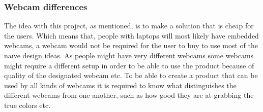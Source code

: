 \subsubsection{Webcam differences}
The idea with this project, as mentioned, is to make a solution that is cheap for the users. Which means that, people with laptops will most likely have embedded webcams, a webcam would not be required for the user to buy to use most of the naïve design ideas. As people might have very different webcams some webcams might require a different setup in order to be able to use the product because of quality of the designated webcam etc. To be able to create a product that can be used by all kinds of webcams it is required to know what distinguishes the different webcams from one another, such as how good they are at grabbing the true colors etc.